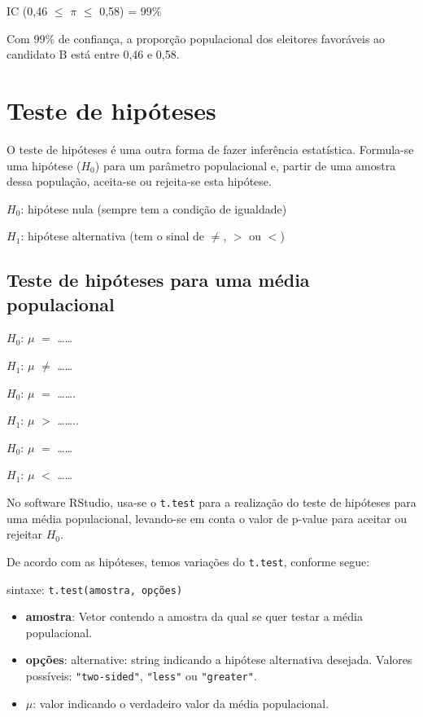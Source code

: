 \documentclass[12pt,brazil,oneside]{book}
\providecommand{\tightlist}{%
  \setlength{\itemsep}{0pt}\setlength{\parskip}{0pt}}
\begin{document}
IC (0,46 \(\leq\) \(\pi\) \(\leq\) 0,58) = 99\%

Com 99\% de confiança, a proporção populacional dos eleitores favoráveis ao candidato B está entre 0,46 e 0,58.

\hypertarget{teste-de-hipoteses}{%
\section{Teste de hipóteses}\label{teste-de-hipoteses}}

O teste de hipóteses é uma outra forma de fazer inferência estatística. Formula-se uma hipótese (\(H_0\)) para um parâmetro populacional e, partir de uma amostra dessa população, aceita-se ou rejeita-se esta hipótese.

\textbf{\(H_0\)}: hipótese nula (sempre tem a condição de igualdade)

\textbf{\(H_1\)}: hipótese alternativa (tem o sinal de \(\neq\), \(>\) ou \(<\))

\hypertarget{teste-de-hipoteses-para-uma-media-populacional}{%
\subsection{Teste de hipóteses para uma média populacional}\label{teste-de-hipoteses-para-uma-media-populacional}}

\(H_0\): \(\mu\) \(=\) \ldots{}\ldots{}

\(H_1\): \(\mu\) \(\neq\) \ldots{}\ldots{}

\(H_0\): \(\mu\) \(=\) \ldots{}\ldots{}.

\(H_1\): \(\mu\) \(>\) \ldots{}\ldots{}..

\(H_0\): \(\mu\) \(=\) \ldots{}\ldots{}

\(H_1\): \(\mu\) \(<\) \ldots{}\ldots{}

No software RStudio, usa-se o \texttt{t.test} para a realização do teste de hipóteses para uma média populacional, levando-se em conta o valor de p-value para aceitar ou rejeitar \(H_0\).

De acordo com as hipóteses, temos variações do \texttt{t.test}, conforme segue:

sintaxe: \texttt{t.test(amostra,\ opções)}

\begin{itemize}
\tightlist
\item
  \textbf{amostra}: Vetor contendo a amostra da qual se quer testar a média populacional.
\item
  \textbf{opções}: alternative: string indicando a hipótese alternativa desejada. Valores possíveis: \texttt{"two-sided"}, \texttt{"less"} ou \texttt{"greater"}.
\item
  \(\mu\): valor indicando o verdadeiro valor da média populacional.
\end{itemize}
\end{document}

